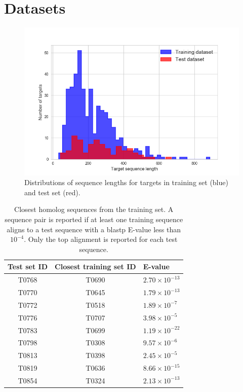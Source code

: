 \documentclass[letter,10pt]{article}
\begin{document}
\section{Datasets}

\begin{figure}[H]
    \centering
    \includegraphics[width=\linewidth]{Fig/datasetLengthDistributions.png}
    \caption{Distributions of sequence lengths for targets in training set (blue) and test set (red).}
    \label{Fig:dataLengthDist}
\end{figure}

\begin{table}[H]
\begin{center}
\begin{tabular}{ c | c | l }
    
    Test set ID & Closest training set ID & E-value \\
    \hline
    T0768 & T0690 & $2.70\times 10^{-13}$ \\
    T0770 & T0645 & $1.79\times 10^{-13}$ \\
    T0772 & T0518 & $1.89\times 10^{-7}$ \\
    T0776 & T0707 & $3.98\times 10^{-5}$ \\
    T0783 & T0699 & $1.19\times 10^{-22}$ \\
    T0798 & T0308 & $9.57\times 10^{-6}$ \\
    T0813 & T0398 & $2.45\times 10^{-5}$ \\
    T0819 & T0636 & $8.66\times 10^{-15}$ \\
    T0854 & T0324 & $2.13\times 10^{-13}$ \\
\end{tabular}
%   
    \caption{Closest homolog sequences from the training set. A
    sequence pair is reported if at least one training sequence aligns
    to a test sequence with a blastp E-value less than $10^{-4}$. Only
    the top alignment is reported for each test sequence.}
%
\label{Tbl:datasetsSimilarity}
\end{center}
\end{table}
\end{document}

